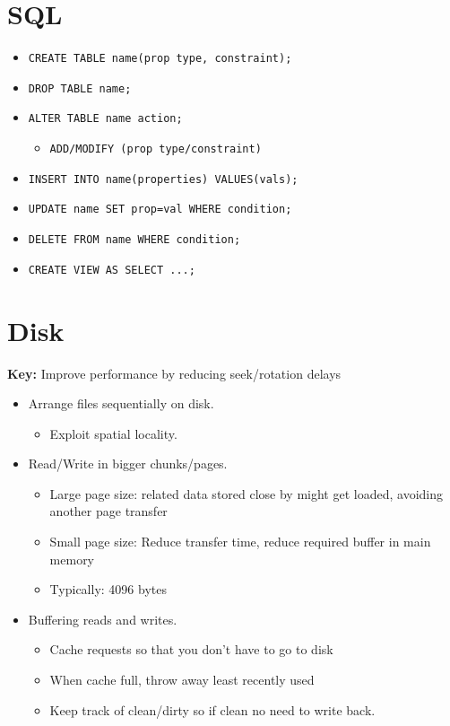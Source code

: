 \documentclass[landscape, letterpaper]{extarticle}
\begin{document}
\begin{multicols}{3}
    \section*{SQL}
    \begin{itemize}[noitemsep,nolistsep]
        \item \verb|CREATE TABLE name(prop type, constraint);|
        \item \verb|DROP TABLE name;|
        \item \verb|ALTER TABLE name action;|
              \begin{itemize}[noitemsep,nolistsep]
                  \item \verb|ADD/MODIFY (prop type/constraint)|
              \end{itemize}
        \item \verb|INSERT INTO name(properties) VALUES(vals);|
        \item \verb|UPDATE name SET prop=val WHERE condition;|
        \item \verb|DELETE FROM name WHERE condition;|
        \item \verb|CREATE VIEW AS SELECT ...;|
    \end{itemize}

    \section*{Disk}
    \textbf{Key:} Improve performance by reducing seek/rotation delays

    \begin{itemize}[noitemsep,nolistsep]
        \item Arrange files sequentially on disk.
              \begin{itemize}[noitemsep,nolistsep]
                  \item Exploit spatial locality.
              \end{itemize}
        \item Read/Write in bigger chunks/pages.
              \begin{itemize}[noitemsep,nolistsep]
                  \item Large page size: related data stored close by might get loaded, avoiding another page transfer
                  \item Small page size: Reduce transfer time, reduce required buffer in main memory
                  \item Typically: 4096 bytes
              \end{itemize}
        \item Buffering reads and writes.
              \begin{itemize}[noitemsep,nolistsep]
                  \item Cache requests so that you don't have to go to disk
                  \item When cache full, throw away least recently used
                  \item Keep track of clean/dirty so if clean no need to write back.
              \end{itemize}
    \end{itemize}

\end{multicols}
\end{document}
